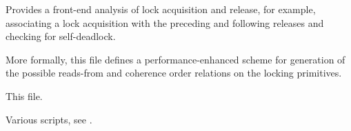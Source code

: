 \begin{description}[style=nextline]
\item[\path{lock.cat}]
	Provides a front-end analysis of lock acquisition and release,
	for example, associating a lock acquisition with the preceding
	and following releases and checking for self-deadlock.

	More formally, this file defines a performance-enhanced scheme
	for generation of the possible reads-from and coherence order
	relations on the locking primitives.

\item[\path{README}]
	This file.

\item[\path{scripts}]
	Various scripts, see .
\end{description}
